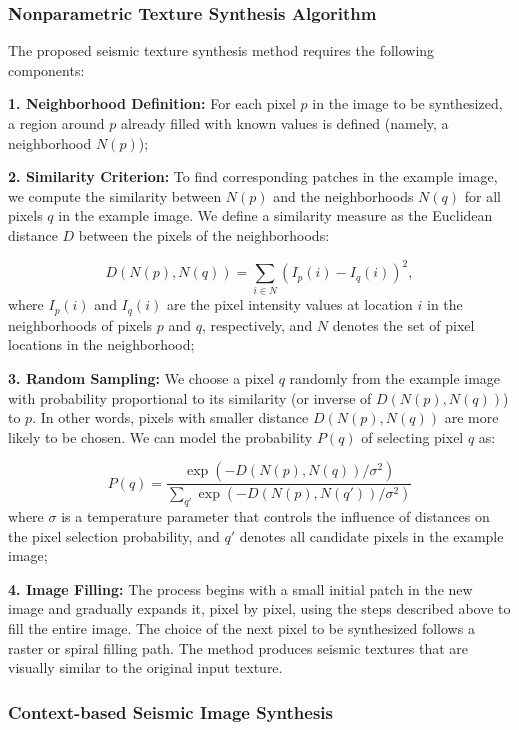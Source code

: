 \documentclass{ieeeaccess}
\begin{document}
\subsubsection{Nonparametric Texture Synthesis Algorithm}

The proposed seismic texture synthesis method requires the following components:

\textbf{1. Neighborhood Definition:} For each pixel $p$ in the image to be synthesized, a region around $p$ already filled with known values is defined (namely, a neighborhood $N(p)$);

\textbf{2. Similarity Criterion:} To find corresponding patches in the example image, we compute the similarity between $N(p)$ and the neighborhoods $N(q)$ for all pixels $q$ in the example image. We define a similarity measure as the Euclidean distance $D$ between the pixels of the neighborhoods:

\begin{equation}
D(N(p), N(q)) = \sum_{i \in N} \left( I_p(i) - I_q(i) \right)^2,
\end{equation}
where $I_p(i)$ and $I_q(i)$ are the pixel intensity values at location $i$ in the neighborhoods of pixels $p$ and $q$, respectively, and $N$ denotes the set of pixel locations in the neighborhood;

\textbf{3. Random Sampling:} We choose a pixel $q$ randomly from the example image with probability proportional to its similarity (or inverse of $D(N(p), N(q))$) to $p$. In other words, pixels with smaller distance $D(N(p), N(q))$ are more likely to be chosen. We can model the probability $P(q)$ of selecting pixel $q$ as:

\begin{equation}
P(q) = \frac{\exp(-D(N(p), N(q)) / \sigma^2)}{\sum_{q'} \exp(-D(N(p), N(q')) / \sigma^2)}
\end{equation}
where $\sigma$ is a temperature parameter that controls the influence of distances on the pixel selection probability, and $q'$ denotes all candidate pixels in the example image;

\textbf{4. Image Filling:} The process begins with a small initial patch in the new image and gradually expands it, pixel by pixel, using the steps described above to fill the entire image. The choice of the next pixel to be synthesized follows a raster or spiral filling path. The method produces seismic textures that are visually similar to the original input texture. 

\subsubsection{Context-based Seismic Image Synthesis}
\end{document}
